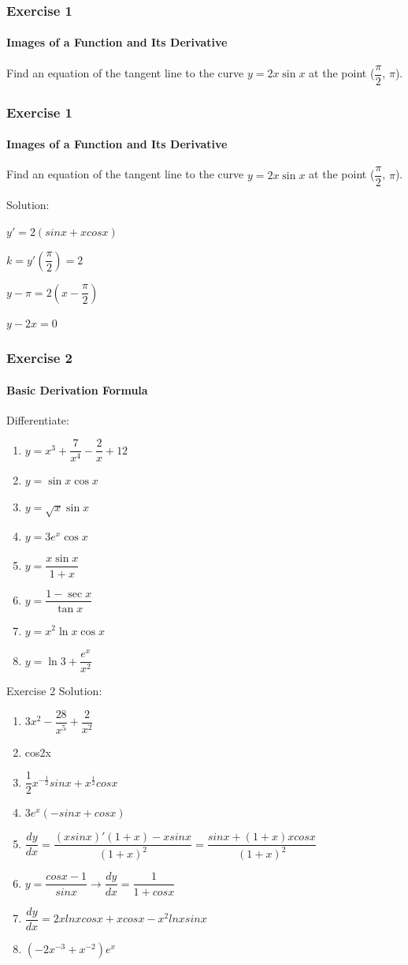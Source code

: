 \documentclass{beamer}
\begin{document}
\begin{frame}
		\frametitle{Exercise 1}
		\framesubtitle{Images of a Function and Its Derivative}
			Find an equation of the tangent line to the curve $y = 2x\sin{x}$ at the point ($\dfrac{\pi}{2}$, $\pi$).
	\end{frame}
	
\begin{frame}
		\frametitle{Exercise 1}
		\framesubtitle{Images of a Function and Its Derivative}
			Find an equation of the tangent line to the curve $y = 2x\sin{x}$ at the point ($\dfrac{\pi}{2}$, $\pi$).
			
			Solution: 
			
			$y' = 2(sinx + xcosx)$
			
			$k = y'(\dfrac{\pi}{2}) = 2$
			
			$y - \pi = 2(x - \dfrac{\pi}{2})$
			
			$ y - 2x = 0$
	\end{frame}


\begin{frame}
\frametitle{Exercise 2}
    \framesubtitle{Basic Derivation Formula}
		Differentiate:
		\begin{enumerate}
			\item $y = x^{3} + \dfrac{7}{x^{4}} - \dfrac{2}{x} + 12$
			\item $y = \sin{x}\cos{x}$
			\item $y = \sqrt{x}\sin{x}$
			\item $y = 3e^{x}\cos{x}$
			\item $y = \dfrac{x\sin{x}}{1 + x}$
			\item $y = \dfrac{1 - \sec{x}}{\tan{x}}$
			\item $y = x^{2}\ln{x}\cos{x}$
			\item $y = \ln{3} + \dfrac{e^{x}}{x^{2}}$
		\end{enumerate}
\end{frame}

\begin{frame}{Exercise 2}
Solution:

\begin{enumerate}
    \item $3x^2 - \dfrac{28}{x^5} + \dfrac{2}{x^2}$
    \item cos2x
    \item $\dfrac{1}{2}x^{-\frac{1}{2}}sinx + x^{\frac{1}{2}}cosx$
    \item $3e^x(-sinx + cosx)$
    \item $\dfrac{dy}{dx} = \dfrac{(xsinx)'(1+x)-xsinx}{(1+x)^2} = \dfrac{sinx + (1+x)xcosx}{(1+x)^2}$
    \item $y = \dfrac{cosx-1}{sinx}  \rightarrow \dfrac{dy}{dx} = \dfrac{1}{1+cosx}$
    \item $\dfrac{dy}{dx} = 2xlnxcosx + xcosx - x^2lnxsinx$
    \item $(-2x^{-3} + x^{-2})e^x$
\end{enumerate}
    
\end{frame}
\end{document}
